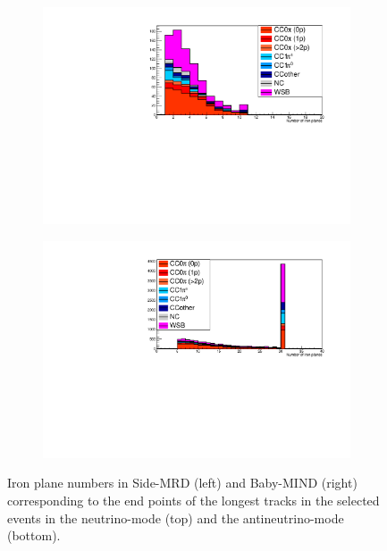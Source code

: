 \begin{figure}[tbh]
\begin{center}
\begin{subfigure}{0.48\textwidth}
     \includegraphics[width=\linewidth]{fig/RHCMuonPenetration_SideMRD_StoppedOrThroughGoing.pdf}
    \end{subfigure}
  \begin{subfigure}{0.48\textwidth}
    \includegraphics[width=\linewidth]{fig/RHCMuonPenetration_DownstreamMRD_StoppedOrThroughGoing.pdf}
    \end{subfigure}    
    \end{center}
  \caption{
Iron plane numbers in Side-MRD (left) and Baby-MIND (right) corresponding to the end points of the longest tracks in the selected events in the neutrino-mode (top) and the antineutrino-mode (bottom).
}
\label{fig:fig:endpoint_longest_track}
\end{figure}



